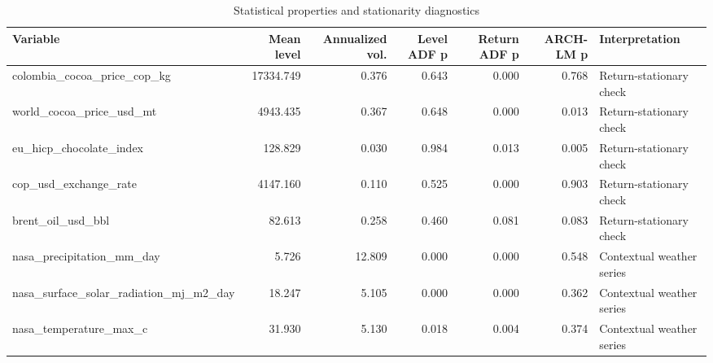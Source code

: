 \begin{table}
\caption{Statistical properties and stationarity diagnostics}
\label{tab:stats_overview}
\begin{tabular}{lrrrrrl}
\toprule
Variable & Mean level & Annualized vol. & Level ADF p & Return ADF p & ARCH-LM p & Interpretation \\
\midrule
colombia_cocoa_price_cop_kg & 17334.749 & 0.376 & 0.643 & 0.000 & 0.768 & Return-stationary check \\
world_cocoa_price_usd_mt & 4943.435 & 0.367 & 0.648 & 0.000 & 0.013 & Return-stationary check \\
eu_hicp_chocolate_index & 128.829 & 0.030 & 0.984 & 0.013 & 0.005 & Return-stationary check \\
cop_usd_exchange_rate & 4147.160 & 0.110 & 0.525 & 0.000 & 0.903 & Return-stationary check \\
brent_oil_usd_bbl & 82.613 & 0.258 & 0.460 & 0.081 & 0.083 & Return-stationary check \\
nasa_precipitation_mm_day & 5.726 & 12.809 & 0.000 & 0.000 & 0.548 & Contextual weather series \\
nasa_surface_solar_radiation_mj_m2_day & 18.247 & 5.105 & 0.000 & 0.000 & 0.362 & Contextual weather series \\
nasa_temperature_max_c & 31.930 & 5.130 & 0.018 & 0.004 & 0.374 & Contextual weather series \\
\bottomrule
\end{tabular}
\end{table}

